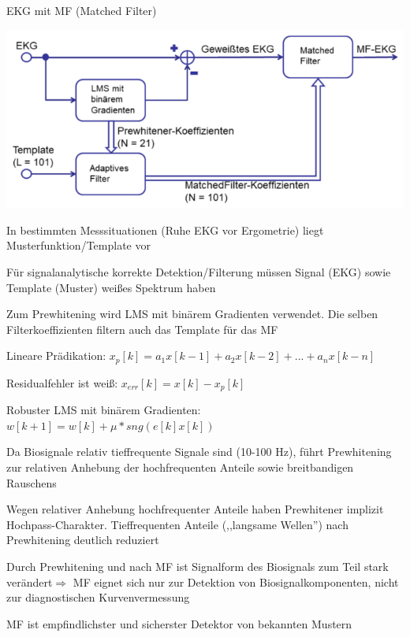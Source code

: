 \documentclass[a4paper]{article}
\begin{document}
\begin{multicols}{3}
  EKG mit MF (Matched Filter)
  \begin{center}
    \includegraphics[width=.5\linewidth]{Assets/Biosignalverarbeitung-adaptive-filter-match-filter.png}
  \end{center}
  \begin{itemize*}
    \item In bestimmten Messsituationen (Ruhe EKG vor Ergometrie) liegt Musterfunktion/Template vor
    \item Für signalanalytische korrekte Detektion/Filterung müssen Signal (EKG) sowie Template (Muster) weißes Spektrum haben
    \item Zum Prewhitening wird LMS mit binärem Gradienten verwendet. Die selben Filterkoeffizienten filtern auch das Template für das MF
    \item Lineare Prädikation: $x_p[k]=a_1x[k-1]+a_2x[k-2]+...+a_nx[k-n]$
    \item Residualfehler ist weiß: $x_{err}[k]=x[k]-x_p[k]$
    \item Robuster LMS mit binärem Gradienten: $w[k+1]=w[k]+\mu*sng(e[k]x[k])$
    \item Da Biosignale relativ tieffrequente Signale sind (10-100 Hz), führt Prewhitening zur relativen Anhebung der hochfrequenten Anteile sowie breitbandigen Rauschens
    \item Wegen relativer Anhebung hochfrequenter Anteile haben Prewhitener implizit Hochpass-Charakter. Tieffrequenten Anteile (,,langsame Wellen'') nach Prewhitening deutlich reduziert

    \item Durch Prewhitening und nach MF ist Signalform des Biosignals zum Teil stark verändert$\Rightarrow$ MF eignet sich nur zur Detektion von Biosignalkomponenten, nicht zur diagnostischen Kurvenvermessung
    \item MF ist empfindlichster und sicherster Detektor von bekannten Mustern
  \end{itemize*}

\end{multicols}
\end{document}
